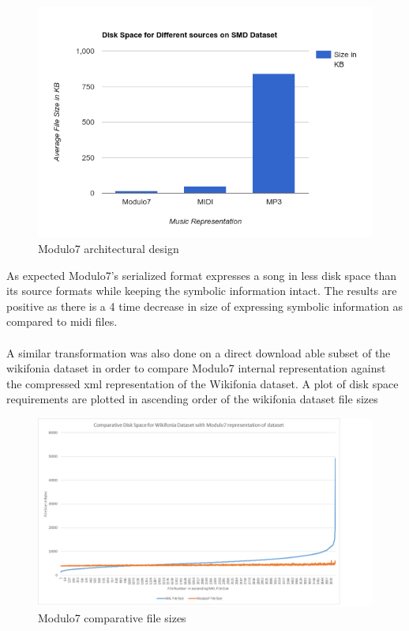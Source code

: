 \begin{figure}[!htb]
\centering
\includegraphics[width=\textwidth]{Modulo7SMDBarGraph.png}
\makeatletter
\let\@currsize\normalsize
\caption{Modulo7 architectural design}
\label{fig:figure}
\end{figure}
\noindent As expected Modulo7's serialized format expresses a song in less disk space than its source formats while keeping the symbolic information intact. The results are positive as there is a 4 time decrease in size of expressing symbolic information as compared to midi files. \\\\
A similar transformation was also done on a direct download able subset of the wikifonia dataset \cite{WikifoniaDataset} in order to compare Modulo7 internal representation against the compressed xml representation of the Wikifonia dataset. A plot of disk space requirements are plotted in ascending order of the wikifonia dataset file sizes \\
\begin{figure}[!htb]
\centering
\includegraphics[width=\textwidth]{M7Graph.png}
\makeatletter
\let\@currsize\normalsize
\caption{Modulo7 comparative file sizes}
\label{fig:filesizes}
\end{figure}

